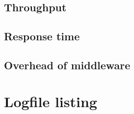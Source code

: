 \documentclass[11pt]{article}
\begin{document}
% 



\subsection{Throughput}

\subsection{Response time}

\subsection{Overhead of middleware}



\pagebreak

\section*{Logfile listing}

\end{document}
